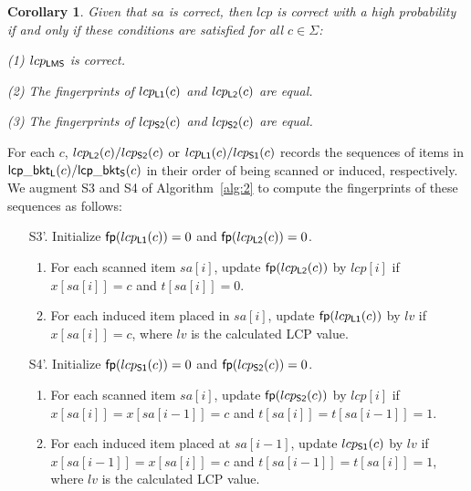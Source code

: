 \documentclass[10pt,journal,compsoc]{IEEEtran}
\newtheorem{Corollary}{Corollary}
\begin{document}
	\begin{Corollary} \label{corollary:2}
	Given that $sa$ is correct, then $lcp$ is correct with a high probability if and only if these conditions are satisfied for all $c \in \Sigma$:
		
		(1) $lcp_{\sf LMS}$ is correct.
		
		(2) The fingerprints of $lcp_{\sf L1}(c)$ and $lcp_{\sf L2}(c)$ are equal.
		
		(3) The fingerprints of $lcp_{\sf S2}(c)$ and $lcp_{\sf S2}(c)$ are equal.
		
	\end{Corollary}
	
	For each $c$, $lcp_{\sf L2}(c)/lcp_{\sf S2}(c)$ or $lcp_{\sf L1}(c)/lcp_{\sf S1}(c)$ records the sequences of items in ${\sf lcp\_bkt_L}(c)/{\sf lcp\_bkt_S}(c)$ in their order of being scanned or induced, respectively. We augment S3 and S4 of Algorithm~\ref{alg:2} to compute the fingerprints of these sequences as follows:
	
	\begin{enumerate}
		
		\item [S3'.] Initialize ${\sf fp}(lcp_{\sf L1}(c)) = 0$ and ${\sf fp}(lcp_{\sf L2}(c)) = 0$.
		
		\begin{enumerate} [(1)]
			
			\item For each scanned item $sa[i]$, update ${\sf fp}(lcp_{\sf L2}(c))$ by $lcp[i]$ if $x[sa[i]] = c$ and $t[sa[i]] = 0$.
			
			\item For each induced item placed in $sa[i]$, update ${\sf fp}(lcp_{\sf L1}(c))$ by $lv$ if $x[sa[i]] = c$, where $lv$ is the calculated LCP value.
			
		\end{enumerate}
		
		\item [S4'.] Initialize ${\sf fp}(lcp_{\sf S1}(c)) = 0$ and ${\sf fp}(lcp_{\sf S2}(c)) = 0$.
		
		\begin{enumerate}[(1)]
			
			\item  For each scanned item $sa[i]$, update ${\sf fp}(lcp_{\sf S2}(c))$ by $lcp[i]$ if $x[sa[i]] = x[sa[i - 1]] = c$ and $t[sa[i]] = t[sa[i - 1]] = 1$.
			
			\item For each induced item placed at $sa[i - 1]$, update $lcp_{\sf S1}(c)$ by $lv$ if $x[sa[i - 1]] = x[sa[i]] = c$ and $t[sa[i - 1]] = t[sa[i]] = 1$, where $lv$ is the calculated LCP value.
			
		\end{enumerate}
		
	\end{enumerate}
	
\end{document}
